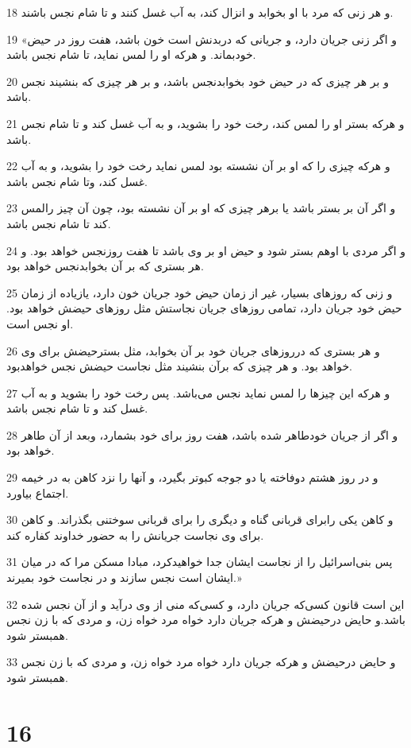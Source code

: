 \par 18 و هر زنی که مرد با او بخوابد و انزال کند، به آب غسل کنند و تا شام نجس باشند.
\par 19 «و اگر زنی جریان دارد، و جریانی که دربدنش است خون باشد، هفت روز در حیض خودبماند. و هر‌که او را لمس نماید، تا شام نجس باشد.
\par 20 و بر هر چیزی که در حیض خود بخوابدنجس باشد، و بر هر چیزی که بنشیند نجس باشد.
\par 21 و هر‌که بستر او را لمس کند، رخت خود را بشوید، و به آب غسل کند و تا شام نجس باشد.
\par 22 و هر‌که چیزی را که او بر آن نشسته بود لمس نماید رخت خود را بشوید، و به آب غسل کند، وتا شام نجس باشد.
\par 23 و اگر آن بر بستر باشد یا برهر چیزی که او بر آن نشسته بود، چون آن چیز رالمس کند تا شام نجس باشد.
\par 24 و اگر مردی با اوهم بستر شود و حیض او بر وی باشد تا هفت روزنجس خواهد بود. و هر بستری که بر آن بخوابدنجس خواهد بود.
\par 25 و زنی که روزهای بسیار، غیر از زمان حیض خود جریان خون دارد، یازیاده از زمان حیض خود جریان دارد، تمامی روزهای جریان نجاستش مثل روزهای حیضش خواهد بود. او نجس است.
\par 26 و هر بستری که درروزهای جریان خود بر آن بخوابد، مثل بسترحیضش برای وی خواهد بود. و هر چیزی که برآن بنشیند مثل نجاست حیضش نجس خواهدبود.
\par 27 و هر‌که این چیزها را لمس نماید نجس می‌باشد. پس رخت خود را بشوید و به آب غسل کند و تا شام نجس باشد.
\par 28 و اگر از جریان خودطاهر شده باشد، هفت روز برای خود بشمارد، وبعد از آن طاهر خواهد بود.
\par 29 و در روز هشتم دوفاخته یا دو جوجه کبوتر بگیرد، و آنها را نزد کاهن به در خیمه اجتماع بیاورد.
\par 30 و کاهن یکی رابرای قربانی گناه و دیگری را برای قربانی سوختنی بگذراند. و کاهن برای وی نجاست جریانش را به حضور خداوند کفاره کند.
\par 31 پس بنی‌اسرائیل را از نجاست ایشان جدا خواهیدکرد، مبادا مسکن مرا که در میان ایشان است نجس سازند و در نجاست خود بمیرند.»
\par 32 این است قانون کسی‌که جریان دارد، و کسی‌که منی از وی درآید و از آن نجس شده باشد.و حایض درحیضش و هر‌که جریان دارد خواه مرد خواه زن، و مردی که با زن نجس همبستر شود.
\par 33 و حایض درحیضش و هر‌که جریان دارد خواه مرد خواه زن، و مردی که با زن نجس همبستر شود.
 
\chapter{16}

